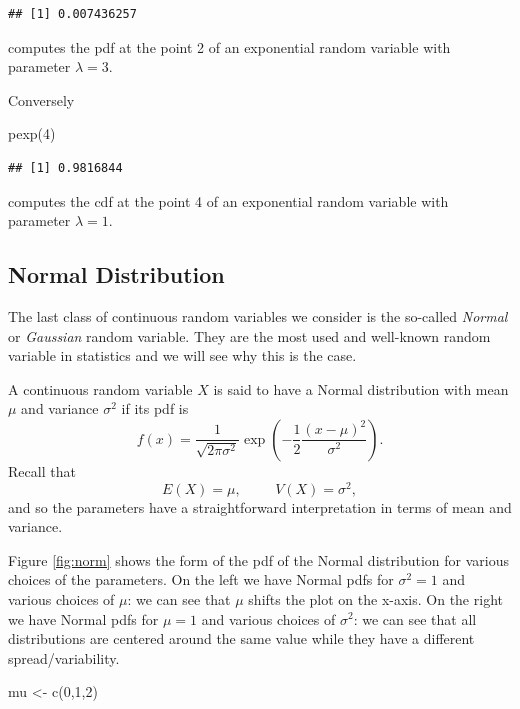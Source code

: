 \documentclass[
]{book}
\newenvironment{Shaded}{\begin{snugshade}}{\end{snugshade}}
\newcommand{\DecValTok}[1]{\textcolor[rgb]{0.00,0.00,0.81}{#1}}
\newcommand{\FunctionTok}[1]{\textcolor[rgb]{0.00,0.00,0.00}{#1}}
\newcommand{\NormalTok}[1]{#1}
\newcommand{\OtherTok}[1]{\textcolor[rgb]{0.56,0.35,0.01}{#1}}
\begin{document}
\begin{verbatim}
## [1] 0.007436257
\end{verbatim}

computes the pdf at the point 2 of an exponential random variable with parameter \(\lambda =3\).

Conversely

\begin{Shaded}
\begin{Highlighting}[]
\FunctionTok{pexp}\NormalTok{(}\DecValTok{4}\NormalTok{)}
\end{Highlighting}
\end{Shaded}

\begin{verbatim}
## [1] 0.9816844
\end{verbatim}

computes the cdf at the point 4 of an exponential random variable with parameter \(\lambda =1\).

\hypertarget{normal-distribution}{%
\subsection{Normal Distribution}\label{normal-distribution}}

The last class of continuous random variables we consider is the so-called \emph{Normal} or \emph{Gaussian} random variable. They are the most used and well-known random variable in statistics and we will see why this is the case.

A continuous random variable \(X\) is said to have a Normal distribution with mean \(\mu\) and variance \(\sigma^2\) if its pdf is
\[
f(x) = \frac{1}{\sqrt{2\pi\sigma^2}}\exp\left(-\frac{1}{2}\frac{(x-\mu)^2}{\sigma^2}\right).
\]
Recall that
\[
E(X)=\mu, \hspace{1cm} V(X)=\sigma^2,
\]
and so the parameters have a straightforward interpretation in terms of mean and variance.

Figure \ref{fig:norm} shows the form of the pdf of the Normal distribution for various choices of the parameters. On the left we have Normal pdfs for \(\sigma^2=1\) and various choices of \(\mu\): we can see that \(\mu\) shifts the plot on the x-axis. On the right we have Normal pdfs for \(\mu=1\) and various choices of \(\sigma^2\): we can see that all distributions are centered around the same value while they have a different spread/variability.

\begin{Shaded}
\begin{Highlighting}[]
\NormalTok{mu }\OtherTok{\textless{}{-}} \FunctionTok{c}\NormalTok{(}\DecValTok{0}\NormalTok{,}\DecValTok{1}\NormalTok{,}\DecValTok{2}\NormalTok{)}
\end{Highlighting}
\end{Shaded}
\end{document}
